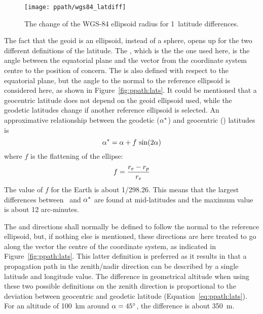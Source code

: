 \begin{figure}[!p]
 \begin{minipage}[c]{0.65\textwidth}
 \texttt{[image: ppath/wgs84\_latdiff]}
 \end{minipage}%
 \begin{minipage}[c]{0.35\textwidth}
  \caption{The change of the WGS-84 ellipsoid radius for  1\degree\ 
            latitude differences.}
  \label{fig:ppath:latdiff}
 \end{minipage}%
\end{figure}   



\label{sec:ppath:geolat}

The fact that the geoid is an ellipsoid, instead of a sphere, opens up
for the two different definitions of the latitude. The
, which is the the one used here, is the
angle between the equatorial plane and the vector from the coordinate
system centre to the position of concern. The  is also defined with respect to the equatorial plane, but
the angle to the normal to the reference ellipsoid is considered here, as
shown in Figure~\ref{fig:ppath:lats}. It could be mentioned that a
geocentric latitude does not depend on the geoid ellipsoid used, while
the geodetic latitudes change if another reference ellipsoid is
selected. An approximative relationship between the geodetic
($\alpha^*$) and geocentric (\Lat) latitudes is \citep{montenbruck:00}
\begin{equation}
 \alpha^* = \alpha + f\,\sin(2\alpha)  
 \label{eq:ppath:lats}
\end{equation}
where $f$ is the flattening of the ellipse:
\begin{equation}
 f = \frac{r_{e}-r_{p}}{r_{e}}
 \label{eq:ppath:flattening}
\end{equation}
The value of $f$ for the Earth is about 1/298.26. This means that the
largest differences between \Lat\ and $\alpha^*$ are found at
mid-latitudes and the maximum value is about 12 arc-minutes.

The  and  directions shall normally be
defined to follow the normal to the reference ellipsoid, but, if
nothing else is mentioned, these directions are here treated to go
along the vector the centre of the coordinate system, as indicated in
Figure~\ref{fig:ppath:lats}. This latter definition is preferred
as it results in that a propagation path in the zenith/nadir direction
can be described by a single latitude and longitude value. The
difference in geometrical altitude when using these two possible
definitions on the zenith direction is proportional to the deviation
between geocentric and geodetic latitude (Equation~\ref{eq:ppath:lats}).
For an altitude of 100~km around $\alpha=45^\circ$, the difference is
about 350~m.


